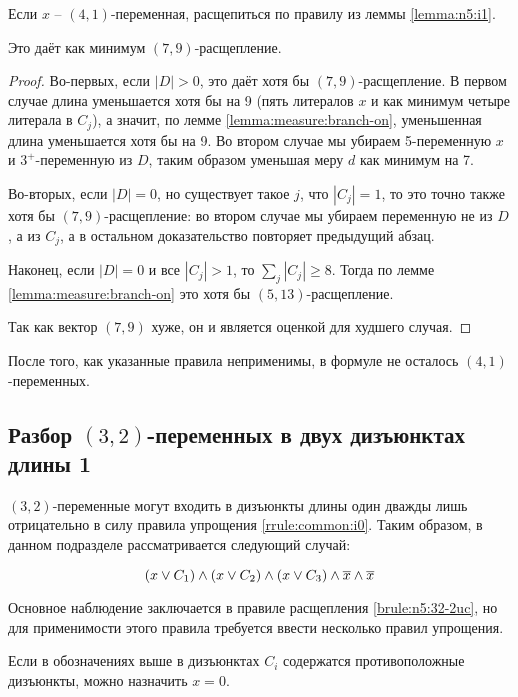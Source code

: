 \begin{brule}
 Если $x$ -- $(4,1)$-переменная, расщепиться по правилу из леммы \ref{lemma:n5:i1}.

 Это даёт как минимум $(7,9)$-расщепление.
 \label{brule:n5:41}
\end{brule}

\begin{proof}
 Во-первых, если $|D| > 0$, это даёт хотя бы $(7,9)$-расщепление. В первом случае длина уменьшается хотя бы на 9 (пять литералов $x$ и как минимум четыре литерала в $C_j$), а значит, по лемме \ref{lemma:measure:branch-on}, уменьшенная длина уменьшается хотя бы на 9. Во втором случае мы убираем 5-переменную $x$ и $3^+$-переменную из $D$, таким образом уменьшая меру $d$ как минимум на 7.

 Во-вторых, если $|D| = 0$, но существует такое $j$, что $|C_j| = 1$, то это точно также хотя бы $(7,9)$-расщепление: во втором случае мы убираем переменную не из $D$, а из $C_j$, а в остальном доказательство повторяет предыдущий абзац.

 Наконец, если $|D| = 0$ и все $|C_j| > 1$, то $\sum_j |C_j| \geq 8$. Тогда по лемме \ref{lemma:measure:branch-on} это хотя бы $(5,13)$-расщепление.

 Так как вектор $(7,9)$ хуже, он и является оценкой для худшего случая.
\end{proof}

После того, как указанные правила неприменимы, в формуле не осталось $(4,1)$-переменных.

\subsection{Разбор $(3,2)$-переменных в двух дизъюнктах длины 1}
\label{subsec:n5:32-3uc}

\firstpar{}$(3,2)$-переменные могут входить в дизъюнкты длины один дважды лишь отрицательно в силу правила упрощения \ref{rrule:common:i0}. Таким образом, в данном подразделе рассматривается следующий случай:

$$
 (x \vee C_1) \wedge (x \vee C_2) \wedge (x \vee C_3) \wedge \overline{x} \wedge \overline{x}
$$

Основное наблюдение заключается в правиле расщепления \ref{brule:n5:32-2uc}, но для применимости этого правила требуется ввести несколько правил упрощения.

\begin{rrule}
 Если в обозначениях выше в дизъюнктах $C_i$ содержатся противоположные дизъюнкты, можно назначить $x = 0$.
 \label{rrule:n5:32-2uc:compl}
\end{rrule}

